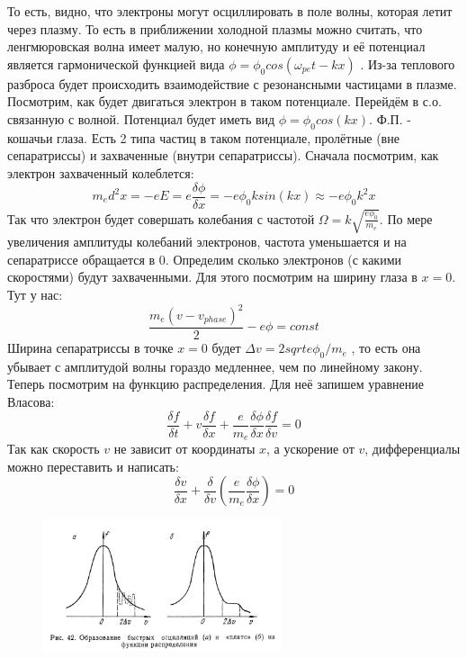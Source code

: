\documentclass[10pt, a4paper]{article}
\begin{document}
То есть, видно, что электроны могут осциллировать в поле волны, которая летит через плазму. То есть в приближении холодной плазмы можно считать, что ленгмюровская волна имеет малую, но конечную амплитуду и её потенциал является гармонической функцией вида $\phi = \phi_0 cos(\omega_{pe} t -kx)$ .  Из-за теплового разброса будет происходить взаимодействие с резонансными частицами в плазме. Посмотрим, как будет двигаться электрон в таком потенциале. Перейдём в с.о. связанную с волной. Потенциал будет иметь вид $\phi = \phi_0 cos(kx)$. Ф.П. - кошачьи глаза. Есть 2 типа частиц в таком потенциале, пролётные (вне сепаратриссы) и захваченные (внутри сепаратриссы).
Сначала посмотрим, как электрон захваченный колеблется:
\begin{equation}
	m_e d^2 x=-eE=e \frac{\delta \phi}{\delta x}=-e \phi_0 k  sin(kx) \approx -e \phi_0 k^2 x
\end{equation}
Так что электрон будет совершать колебания с частотой $\Omega =k\sqrt{\frac{e \phi_0}{m_e}}$. По мере увеличения амплитуды колебаний электронов, частота уменьшается и на сепаратриссе обращается в 0. Определим сколько электронов (с какими скоростями) будут захваченными. Для этого посмотрим на ширину глаза в $x=0$. Тут у нас:
\begin{equation}
	\frac{m_e (v-v_{phase})^2}{2} - e \phi =const
\end{equation}
Ширина сепаратриссы в точке $x=0$ будет $\Delta v= 2 sqrt{e \phi_0 / m_e}$ , то есть она убывает с амплитудой волны гораздо медленнее, чем по линейному закону. 
Теперь посмотрим на функцию распределения. Для неё запишем уравнение Власова:
\begin{equation}
	\frac{\delta f}{\delta t} + v \frac{\delta f}{\delta x} + \frac{e}{m_e} \frac{\delta \phi}{\delta x} \frac{\delta f}{\delta v} =0 
\end{equation}
Так как скорость $v$ не зависит от координаты $x$, а ускорение от $v$, дифференциалы можно переставить и написать:
\begin{equation}
	\frac{\delta v}{\delta x} +\frac{\delta}{\delta v} (\frac{e}{m_e} \frac{\delta \phi}{\delta x} )=0
\end{equation}

\begin{figure}[ht]
	\begin{center}
		\includegraphics[width=70mm]{zatuh_landau_nonlinear_2.JPG}
	\end{center}
\end{figure}
\end{document}
